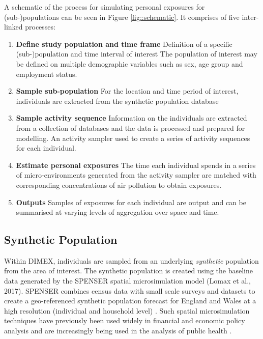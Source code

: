 \documentclass{article}
\begin{document}
A schematic of the process for simulating personal exposures for (sub-)populations can be seen in Figure \ref{fig::schematic}. It  comprises of five inter-linked processes:

\begin{enumerate}
    \item {\bf  Define study population and time frame} Definition of a specific (sub-)population and time interval of interest  The population of interest may be defined on multiple demographic variables such as sex, age group and employment status. 
    \item{\bf Sample sub-population} For the location and time period of interest,  individuals are extracted from the synthetic population database 
    \item {\bf Sample activity sequence}  Information on the individuals are extracted from a collection of databases and the data is processed and prepared for modelling. An activity sampler used to create a series of activity sequences for each individual.
    \item{\bf Estimate personal exposures}  The time each individual spends in a series of micro-environments generated from the activity sampler are matched with corresponding concentrations of air pollution  to obtain exposures.
    \item{\bf Outputs}  Samples of exposures for each individual are output and can be summarised at varying levels of aggregation over space and time. 
\end{enumerate}

\clearpage
\subsection{Synthetic Population}\label{sec::spenser}


Within DIMEX, individuals are sampled from an underlying {\em synthetic} population from the area of interest. The synthetic population is created using the baseline data generated by the SPENSER spatial microsimulation model (Lomax et al., 2017). SPENSER combines census data with small scale surveys and datasets to create a geo-referenced synthetic population forecast for England and Wales at a high resolution (individual and household level) \citep{lomax2017microsimulation, smith2018ukpopulation}. Such  spatial microsimulation techniques have previously been used widely in financial and economic policy analysis \citep{tanton2018spatial} and are  increasingly being used in the analysis of public health \citep{spooner2021dynamic, morrissey2015mental}.\\
\end{document}
